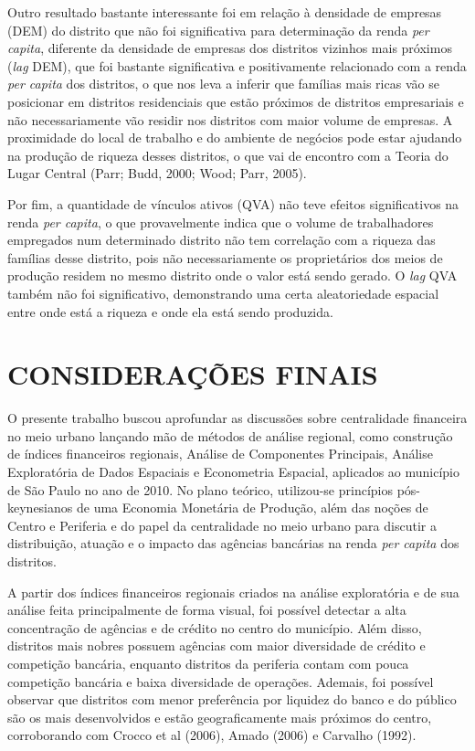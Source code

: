 \documentclass[a4paper,12pt]{article}
\begin{document}
Outro resultado bastante interessante foi em relação à densidade de
empresas (DEM) do distrito que não foi significativa para determinação
da renda \emph{per capita}, diferente da densidade de empresas dos
distritos vizinhos mais próximos (\emph{lag} DEM), que foi bastante
significativa e positivamente relacionado com a renda \emph{per capita}
dos distritos, o que nos leva a inferir que famílias mais ricas vão se
posicionar em distritos residenciais que estão próximos de distritos
empresariais e não necessariamente vão residir nos distritos com maior
volume de empresas. A proximidade do local de trabalho e do ambiente de
negócios pode estar ajudando na produção de riqueza desses distritos, o
que vai de encontro com a Teoria do Lugar Central (Parr; Budd, 2000;
Wood; Parr, 2005).

Por fim, a quantidade de vínculos ativos (QVA) não teve efeitos
significativos na renda \emph{per capita}, o que provavelmente indica
que o volume de trabalhadores empregados num determinado distrito não
tem correlação com a riqueza das famílias desse distrito, pois não
necessariamente os proprietários dos meios de produção residem no mesmo
distrito onde o valor está sendo gerado. O \emph{lag} QVA também não foi
significativo, demonstrando uma certa aleatoriedade espacial entre onde
está a riqueza e onde ela está sendo produzida.

\hypertarget{considerauxe7uxf5es-finais}{%
\section{CONSIDERAÇÕES FINAIS}\label{considerauxe7uxf5es-finais}}

O presente trabalho buscou aprofundar as discussões sobre centralidade
financeira no meio urbano lançando mão de métodos de análise regional,
como construção de índices financeiros regionais, Análise de Componentes
Principais, Análise Exploratória de Dados Espaciais e Econometria
Espacial, aplicados ao município de São Paulo no ano de 2010. No plano
teórico, utilizou-se princípios pós-keynesianos de uma Economia
Monetária de Produção, além das noções de Centro e Periferia e do papel
da centralidade no meio urbano para discutir a distribuição, atuação e o
impacto das agências bancárias na renda \emph{per capita} dos distritos.

A partir dos índices financeiros regionais criados na análise
exploratória e de sua análise feita principalmente de forma visual, foi
possível detectar a alta concentração de agências e de crédito no centro
do município. Além disso, distritos mais nobres possuem agências com
maior diversidade de crédito e competição bancária, enquanto distritos
da periferia contam com pouca competição bancária e baixa diversidade de
operações. Ademais, foi possível observar que distritos com menor
preferência por liquidez do banco e do público são os mais desenvolvidos
e estão geograficamente mais próximos do centro, corroborando com Crocco
et al (2006), Amado (2006) e Carvalho (1992).
\end{document}
